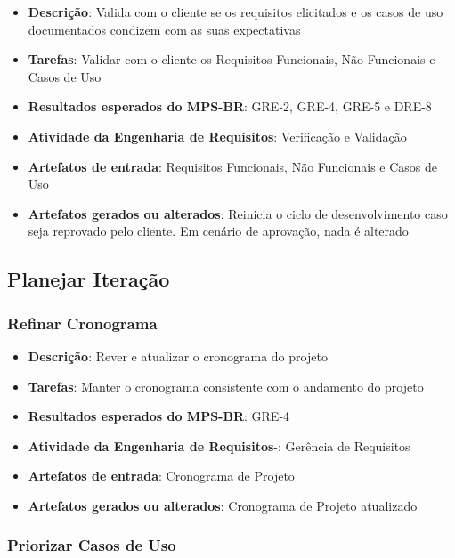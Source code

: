 \begin{itemize}
\item \textbf{Descrição}: Valida com o cliente se os requisitos elicitados e os casos de uso documentados condizem com as suas expectativas
\item \textbf{Tarefas}: Validar com o cliente os Requisitos Funcionais, Não Funcionais e Casos de Uso
\item \textbf{Resultados esperados do MPS-BR}: GRE-2, GRE-4, GRE-5 e DRE-8
\item \textbf{Atividade da Engenharia de Requisitos}: Verificação e Validação
\item \textbf{Artefatos de entrada}: Requisitos Funcionais, Não Funcionais e Casos de Uso
\item \textbf{Artefatos gerados ou alterados}: Reinicia o ciclo de desenvolvimento caso seja reprovado pelo cliente. Em cenário de aprovação, nada é alterado
\end{itemize}

\subsection{Planejar Iteração}

\subsubsection{Refinar Cronograma}

\begin{itemize}
\item \textbf{Descrição}: Rever e atualizar o cronograma do projeto
\item \textbf{Tarefas}: Manter o cronograma consistente com o andamento do projeto
\item \textbf{Resultados esperados do MPS-BR}: GRE-4
\item \textbf{Atividade da Engenharia de Requisitos}-: Gerência de Requisitos
\item \textbf{Artefatos de entrada}: Cronograma de Projeto
\item \textbf{Artefatos gerados ou alterados}: Cronograma de Projeto atualizado
\end{itemize}

\subsubsection{Priorizar Casos de Uso}

